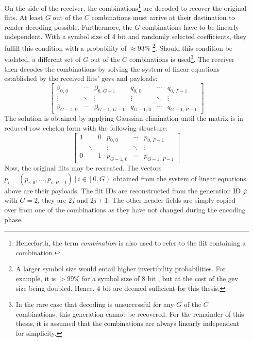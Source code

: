 On the side of the receiver, the combinations\footnote{Henceforth, the term \textit{combination} is also used to refer to the flit containing a
combination.} are decoded to recover the original flits. At least $G$ out of the $C$ combinations must arrive at their
destination to render decoding possible. Furthermore, the $G$ combinations have to be linearly independent. With a symbol size of 4 bit and randomly
selected coefficients, they fulfill this condition with a probability of $\approx 93\%$ \cite[4]{franz18authdraft}\footnote{A larger symbol size would
entail higher invertibility probabilities. For example, it is $>99\%$ for a symbol size of 8 bit \cite[4]{franz18authdraft}, but at the cost of the
\gls{gev} size being doubled. Hence, 4 bit are deemed sufficient for this thesis.}. Should this condition be violated, a different set of $G$ out of
the $C$ combinations is used\footnote{In the rare case that decoding is unsuccessful for any $G$ of the $C$ combinations, this generation cannot be
recovered. For the remainder of this thesis, it is assumed that the combinations are always linearly independent for simplicity.}. The receiver then
decodes the combinations by solving the system of linear equations established by the received flits' \glspl{gev} and payloads:
\[
    \begin{bmatrix}
        \beta_{0,\,0} & \cdots & \beta_{0,\,G-1} & q_{0,\,0} & \cdots & q_{0,\,P-1} \\
        \vdots & \ddots & \vdots & \vdots & \ddots & \vdots \\
        \beta_{G-1,\,0} & \cdots & \beta_{G-1,\,G-1} & q_{G-1,\,0} & \cdots & q_{G-1,\,P-1}
    \end{bmatrix}
\]
The solution is obtained by applying Gaussian elimination until the matrix is in reduced row echelon form with the following structure:
\[
    \begin{bmatrix}
        1 & & 0 & p_{0,\,0} & \cdots & p_{0,\,P-1} \\
        & \ddots & & \vdots & \ddots & \vdots \\
        0 & & 1 & p_{G-1,\,0} & \cdots & p_{G-1,\,P-1}
    \end{bmatrix}
\]
Now, the original flits may be recreated. The vectors $p_i = (p_{i,\,0}, …, p_{i,\,P-1})\ |\ i \in \left[0, G\right)$ obtained from the system of linear
equations above are their payloads. The flit IDs are reconstructed from the generation ID $j$: with $G = 2$, they are $2j$ and $2j+1$. The other
header fields are simply copied over from one of the combinations as they have not changed during the encoding phase.

